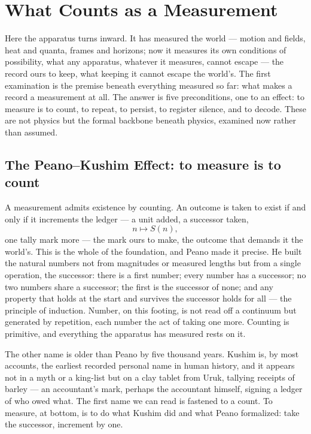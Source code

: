 \chapter{What Counts as a Measurement}
\label{chap:what-counts-as-a-measurement}

Here the apparatus turns inward. It has measured the world --- motion and fields, heat and quanta, frames and
horizons; now it measures its own conditions of possibility, what any apparatus, whatever it measures, cannot
escape --- the record ours to keep, what keeping it cannot escape the world's. The first examination is the
premise beneath everything measured so far: what makes a record a measurement at all. The answer is five
preconditions, one to an effect: to measure is to count, to repeat, to persist, to register silence, and to
decode. These are not physics but the formal backbone beneath physics, examined now rather than assumed.

\section{The Peano--Kushim Effect: to measure is to count}
\label{se:peano-kushim}

A measurement admits existence by counting. An outcome is taken to exist if and only if it increments the
ledger --- a unit added, a successor taken,
\begin{equation}
  n \mapsto S(n),
\end{equation}
one tally mark more --- the mark ours to make, the outcome that demands it the world's. This is the whole of
the foundation, and Peano made it precise. He built the natural
numbers not from magnitudes or measured lengths but from a single operation, the successor: there is a first
number; every number has a successor; no two numbers share a successor; the first is the successor of none;
and any property that holds at the start and survives the successor holds for all --- the principle of
induction.
Number, on this footing, is not read off a continuum but generated by repetition, each number the act of
taking one more. Counting is primitive, and everything the apparatus has measured rests on it.

The other name is older than Peano by five thousand years. Kushim is, by most accounts, the earliest recorded
personal name in human history, and it appears not in a myth or a king-list but on a clay tablet from Uruk, tallying receipts of
barley --- an accountant's mark, perhaps the accountant himself, signing a ledger of who owed what. The first
name we can read is fastened to a count. To measure, at bottom, is to do what Kushim did and what Peano
formalized: take the successor, increment by one.

